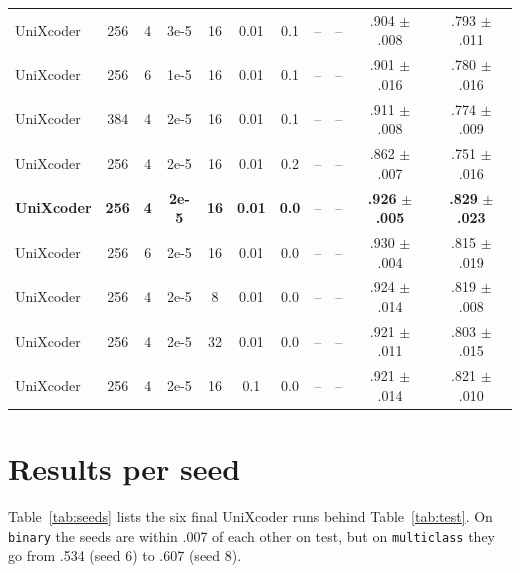 \documentclass[11pt]{article}
\begin{document}
{{\begin{tabular}{lcccccccccc}
    UniXcoder              & 256 & 4  & 3e-5 & 16 & 0.01 & 0.1 & --              & --              & .904 $\pm$ .008 & .793 $\pm$ .011 \\
    UniXcoder              & 256 & 6  & 1e-5 & 16 & 0.01 & 0.1 & --              & --              & .901 $\pm$ .016 & .780 $\pm$ .016 \\
    UniXcoder              & 384 & 4  & 2e-5 & 16 & 0.01 & 0.1 & --              & --              & .911 $\pm$ .008 & .774 $\pm$ .009 \\
    UniXcoder              & 256 & 4  & 2e-5 & 16 & 0.01 & 0.2 & --              & --              & .862 $\pm$ .007 & .751 $\pm$ .016 \\
    \hline
    \textbf{UniXcoder}     & \textbf{256} & \textbf{4} & \textbf{2e-5} & \textbf{16} & \textbf{0.01} & \textbf{0.0} & -- & -- & \textbf{.926} $\pm$ \textbf{.005} & \textbf{.829} $\pm$ \textbf{.023} \\
    UniXcoder              & 256 & 6  & 2e-5 & 16 & 0.01 & 0.0 & --              & --              & .930 $\pm$ .004 & .815 $\pm$ .019 \\
    UniXcoder              & 256 & 4  & 2e-5 & 8  & 0.01 & 0.0 & --              & --              & .924 $\pm$ .014 & .819 $\pm$ .008 \\
    UniXcoder              & 256 & 4  & 2e-5 & 32 & 0.01 & 0.0 & --              & --              & .921 $\pm$ .011 & .803 $\pm$ .015 \\
    UniXcoder              & 256 & 4  & 2e-5 & 16 & 0.1  & 0.0 & --              & --              & .921 $\pm$ .014 & .821 $\pm$ .010 \\
    \hline
  \end{tabular}
  \caption{All tuning runs, dev macro-F1 at the best epoch, mean $\pm$ std over seeds 0--2 ($^\dagger$seeds 0--1 only). Len: tokens read, Ep: epochs, LR: learning rate, BS: batch size, WD: weight decay, Drop: dropout. All encoders use AdamW with a linear schedule, 10\% warmup and no class weights. The baselines are fit once. --: not run. The final UniXcoder configuration is in bold.}
  \label{tab:alltuning}
\par}
\medskip

\section{Results per seed}
\label{app:seeds}

Table~\ref{tab:seeds} lists the six final UniXcoder runs behind Table~\ref{tab:test}. On \texttt{binary} the seeds are within .007 of each other on test, but on \texttt{multiclass} they go from .534 (seed 6) to .607 (seed 8).

}
\end{document}
